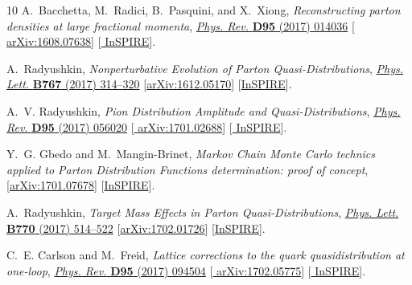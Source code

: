 \begin{thebibliography}{10}
A.~Bacchetta, M.~Radici, B.~Pasquini, and X.~Xiong, {\it {Reconstructing parton
  densities at large fractional momenta}},
\href{http://dx.doi.org/10.1103/PhysRevD.95.014036}{{\em Phys. Rev.} {\bfseries
  D95} (2017) 014036} [\href{http://arxiv.org/abs/1608.07638}{{\ttfamily
  arXiv:1608.07638}}] [\href{http://inspirehep.net/record/1484292}{{\ttfamily
  InSPIRE}}].

A.~Radyushkin, {\it {Nonperturbative Evolution of Parton Quasi-Distributions}},
\href{http://dx.doi.org/10.1016/j.physletb.2017.02.019}{{\em Phys. Lett.}
  {\bfseries B767} (2017) 314--320}
  [\href{http://arxiv.org/abs/1612.05170}{{\ttfamily arXiv:1612.05170}}]
  [\href{http://inspirehep.net/record/1504066}{{\ttfamily InSPIRE}}].

A.~V. Radyushkin, {\it {Pion Distribution Amplitude and Quasi-Distributions}},
\href{http://dx.doi.org/10.1103/PhysRevD.95.056020}{{\em Phys. Rev.} {\bfseries
  D95} (2017) 056020} [\href{http://arxiv.org/abs/1701.02688}{{\ttfamily
  arXiv:1701.02688}}] [\href{http://inspirehep.net/record/1508491}{{\ttfamily
  InSPIRE}}].

Y.~G. Gbedo and M.~Mangin-Brinet,
{\it {Markov Chain Monte Carlo technics applied to Parton Distribution
  Functions determination: proof of concept}},
  [\href{http://arxiv.org/abs/1701.07678}{{\ttfamily arXiv:1701.07678}}]
  [\href{http://inspirehep.net/record/1510890}{{\ttfamily InSPIRE}}].

A.~Radyushkin, {\it {Target Mass Effects in Parton Quasi-Distributions}},
\href{http://dx.doi.org/10.1016/j.physletb.2017.05.024}{{\em Phys. Lett.}
  {\bfseries B770} (2017) 514--522}
  [\href{http://arxiv.org/abs/1702.01726}{{\ttfamily arXiv:1702.01726}}]
  [\href{http://inspirehep.net/record/1512318}{{\ttfamily InSPIRE}}].

C.~E. Carlson and M.~Freid, {\it {Lattice corrections to the quark
  quasidistribution at one-loop}},
\href{http://dx.doi.org/10.1103/PhysRevD.95.094504}{{\em Phys. Rev.} {\bfseries
  D95} (2017) 094504} [\href{http://arxiv.org/abs/1702.05775}{{\ttfamily
  arXiv:1702.05775}}] [\href{http://inspirehep.net/record/1514254}{{\ttfamily
  InSPIRE}}].


\end{thebibliography}
